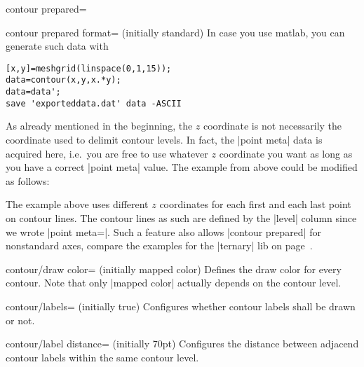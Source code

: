 {{\begin{plottype}[/pgfplots]{contour prepared=\textcolor{black}{}}
\begin{pgfplotskey}{contour prepared format= (initially standard)}
		In case you use matlab, you can generate such data with
\begin{verbatim}
[x,y]=meshgrid(linspace(0,1,15));
data=contour(x,y,x.*y);
data=data';
save 'exporteddata.dat' data -ASCII
\end{verbatim}
	\end{pgfplotskey}

	As already mentioned in the beginning, the $z$ coordinate is not necessarily the coordinate used to delimit contour levels. In fact, the |point meta| data is acquired here, i.e.\ you are free to use whatever $z$ coordinate you want as long as you have a correct |point meta| value. The example from above could be modified as follows:
\begin{codeexample}[]
\end{codeexample}
	\noindent The example above uses different $z$ coordinates for each first and each last point on contour lines. The contour lines as such are defined by the |level| column since we wrote |point meta=|. Such a feature also allows |contour prepared| for nonstandard axes, compare the examples for the |ternary| lib on page~\pageref{page:ternary:contour}.

	\begin{pgfplotskey}{contour/draw color= (initially mapped color)}
		Defines the draw color for every contour. Note that only |mapped color| actually depends on the contour level.
	\end{pgfplotskey}

	\begin{pgfplotskey}{contour/labels= (initially true)}
		Configures whether contour labels shall be drawn or not.
	\end{pgfplotskey}
	\begin{pgfplotskey}{contour/label distance= (initially 70pt)}
		Configures the distance between adjacend contour labels within the same contour level.
	\end{pgfplotskey}


\end{plottype}}}
